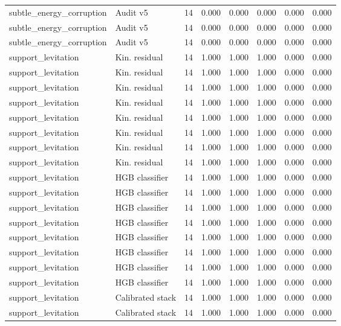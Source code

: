 {\begin{longtable}{llrrrrrr}
subtle\_energy\_corruption & Audit v5 & 14 & 0.000 & 0.000 & 0.000 & 0.000 & 0.000 \\
subtle\_energy\_corruption & Audit v5 & 14 & 0.000 & 0.000 & 0.000 & 0.000 & 0.000 \\
subtle\_energy\_corruption & Audit v5 & 14 & 0.000 & 0.000 & 0.000 & 0.000 & 0.000 \\
support\_levitation & Kin. residual & 14 & 1.000 & 1.000 & 1.000 & 0.000 & 0.000 \\
support\_levitation & Kin. residual & 14 & 1.000 & 1.000 & 1.000 & 0.000 & 0.000 \\
support\_levitation & Kin. residual & 14 & 1.000 & 1.000 & 1.000 & 0.000 & 0.000 \\
support\_levitation & Kin. residual & 14 & 1.000 & 1.000 & 1.000 & 0.000 & 0.000 \\
support\_levitation & Kin. residual & 14 & 1.000 & 1.000 & 1.000 & 0.000 & 0.000 \\
support\_levitation & Kin. residual & 14 & 1.000 & 1.000 & 1.000 & 0.000 & 0.000 \\
support\_levitation & Kin. residual & 14 & 1.000 & 1.000 & 1.000 & 0.000 & 0.000 \\
support\_levitation & Kin. residual & 14 & 1.000 & 1.000 & 1.000 & 0.000 & 0.000 \\
support\_levitation & HGB classifier & 14 & 1.000 & 1.000 & 1.000 & 0.000 & 0.000 \\
support\_levitation & HGB classifier & 14 & 1.000 & 1.000 & 1.000 & 0.000 & 0.000 \\
support\_levitation & HGB classifier & 14 & 1.000 & 1.000 & 1.000 & 0.000 & 0.000 \\
support\_levitation & HGB classifier & 14 & 1.000 & 1.000 & 1.000 & 0.000 & 0.000 \\
support\_levitation & HGB classifier & 14 & 1.000 & 1.000 & 1.000 & 0.000 & 0.000 \\
support\_levitation & HGB classifier & 14 & 1.000 & 1.000 & 1.000 & 0.000 & 0.000 \\
support\_levitation & HGB classifier & 14 & 1.000 & 1.000 & 1.000 & 0.000 & 0.000 \\
support\_levitation & HGB classifier & 14 & 1.000 & 1.000 & 1.000 & 0.000 & 0.000 \\
support\_levitation & Calibrated stack & 14 & 1.000 & 1.000 & 1.000 & 0.000 & 0.000 \\
support\_levitation & Calibrated stack & 14 & 1.000 & 1.000 & 1.000 & 0.000 & 0.000 \\

\end{longtable}}
